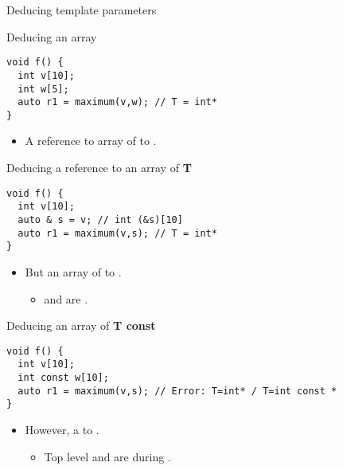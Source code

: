 \begin{frame}{Deducing template parameters}
\begin{block}{Deducing an array}
\begin{lstlisting}
void f() {
  int v[10];
  int w[5];
  auto r1 = maximum(v,w); // T = int*
}
\end{lstlisting}
\end{block}

\framebreak

\begin{itemize}
  \item A reference to array of   to .
\end{itemize}

\begin{block}{Deducing a reference to an array of \textbf{T}}
\begin{lstlisting}
void f() {
  int v[10];
  auto & s = v; // int (&s)[10]
  auto r1 = maximum(v,s); // T = int*
}
\end{lstlisting}
\end{block}

\framebreak

\begin{itemize}
  \item But an array of   to .
    \begin{itemize}
      \item {} and  are .
    \end{itemize}
\end{itemize}

\begin{block}{Deducing an array of \textbf{T const}}
\begin{lstlisting}
void f() {
  int v[10];
  int const w[10];
  auto r1 = maximum(v,s); // Error: T=int* / T=int const *
}
\end{lstlisting}
\end{block}

\framebreak

\begin{itemize}
  \item However, a   to .
    \begin{itemize}
      \item Top level  and  are  during .
    \end{itemize}
\end{itemize}


\end{frame}
